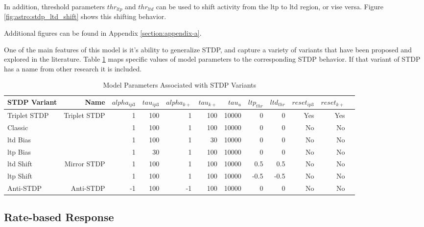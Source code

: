
In addition, threshold parameters $thr_{ltp}$ and $thr_{ltd}$ can be used to
shift activity from the \Gls{ltp} to \Gls{ltd} region, or vise versa. Figure
\ref{fig:astro:stdp_ltd_shift} shows this shifting behavior.


Additional figures can be found in Appendix \ref{section:appendix-a}.

One of the main features of this model is it's ability to generalize STDP,
and capture a variety of variants that have been proposed and explored in the
literature. Table \ref{table:astro_varient_params} maps specific values of
model parameters to the corresponding STDP behavior. If that
variant of STDP has a name from other research it is included.

\begin{table}[!htp]\centering
\caption{Model Parameters Associated with STDP Variants} \label{table:astro_varient_params}
\scriptsize
\begin{tabular}{lrrrrrrrrrrr}\toprule
STDP Variant &Name &$alpha_{ip3}$ &$tau_{ip3}$ &$alpha_{k+}$ &$tau_{k+}$ &$tau_u$ &$ltp_{thr}$ &$ltd_{thr}$ &$reset_{ip3}$ &$reset_{k+}$ \\\midrule
Triplet STDP &Triplet STDP &1 &100 &1 &100 &10000 &0 &0 &Yes &Yes \\
Classic & &1 &100 &1 &100 &10000 &0 &0 &No &No \\
\Gls{ltd} Bias & &1 &100 &1 &30 &10000 &0 &0 &No &No \\
\Gls{ltp} Bias & &1 &30 &1 &100 &10000 &0 &0 &No &No \\
\Gls{ltd} Shift &Mirror STDP &1 &100 &1 &100 &10000 &0.5 &0.5 &No &No \\
\Gls{ltp} Shift & &1 &100 &1 &100 &10000 &-0.5 &-0.5 &No &No \\
Anti-STDP &Anti-STDP &-1 &100 &-1 &100 &10000 &0 &0 &No &No \\
\bottomrule
\end{tabular}
\end{table}

\subsection{Rate-based Response} \label{sec:rate_response}

